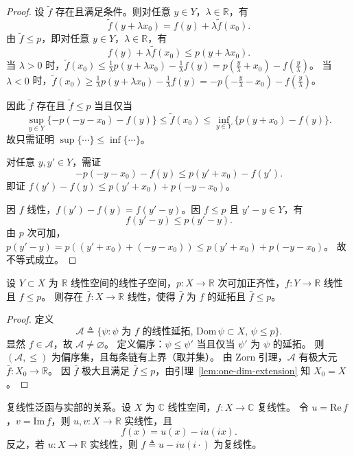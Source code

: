 \documentclass[lang=cn,a4paper,newtx,section]{elegantbook}
\begin{document}
\begin{proof}
  设 $\tilde{f}$ 存在且满足条件。则对任意 $y\in Y$，$\lambda\in\mathbb{R}$，有
  \[
    \tilde{f}(y+\lambda x_0)=f(y)+\lambda\tilde{f}(x_0).
  \]
  由 $\tilde{f}\le p$，即对任意 $y\in Y$，$\lambda\in\mathbb{R}$，有
  \[
    f(y)+\lambda\tilde{f}(x_0)\le p(y+\lambda x_0).
  \]
  当 $\lambda>0$ 时，$\tilde{f}(x_0)\le\frac{1}{\lambda}p(y+\lambda x_0)-\frac{1}{\lambda}f(y)=p\left(\frac{y}{\lambda}+x_0\right)-f\left(\frac{y}{\lambda}\right)$。
  当 $\lambda<0$ 时，$\tilde{f}(x_0)\ge\frac{1}{\lambda}p(y+\lambda x_0)-\frac{1}{\lambda}f(y)=-p\left(-\frac{y}{\lambda}-x_0\right)-f\left(\frac{y}{\lambda}\right)$。

  因此 $\tilde{f}$ 存在且 $\tilde{f}\le p$ 当且仅当
  \[
    \sup_{y\in Y}\{-p(-y-x_0)-f(y)\}\le\tilde{f}(x_0)\le\inf_{y\in Y}\{p(y+x_0)-f(y)\}.
  \]
  故只需证明 $\sup\{\cdots\}\le\inf\{\cdots\}$。

  对任意 $y,y'\in Y$，需证
  \[
    -p(-y-x_0)-f(y)\le p(y'+x_0)-f(y').
  \]
  即证 $f(y')-f(y)\le p(y'+x_0)+p(-y-x_0)$。

  因 $f$ 线性，$f(y')-f(y)=f(y'-y)$。因 $f\le p$ 且 $y'-y\in Y$，有
  \[
    f(y'-y)\le p(y'-y).
  \]
  由 $p$ 次可加，$p(y'-y)=p((y'+x_0)+(-y-x_0))\le p(y'+x_0)+p(-y-x_0)$。
  故不等式成立。
\end{proof}

\begin{theorem}\label{thm:hahn-banach-real}
  设 $Y\subset X$ 为 $\mathbb{R}$ 线性空间的线性子空间，$p:X\to\mathbb{R}$ 次可加正齐性，$f:Y\to\mathbb{R}$ 线性且 $f\le p$。
  则存在 $\bar{f}:X\to\mathbb{R}$ 线性，使得 $\bar{f}$ 为 $f$ 的延拓且 $\bar{f}\le p$。
\end{theorem}

\begin{proof}
  定义
  \[
    \mathcal{A}\triangleq\{\psi:\psi\text{ 为 }f\text{ 的线性延拓},\,\mathrm{Dom}\,\psi\subset X,\,\psi\le p\}.
  \]
  显然 $f\in\mathcal{A}$，故 $\mathcal{A}\ne\varnothing$。
  定义偏序：$\psi\le\psi'$ 当且仅当 $\psi'$ 为 $\psi$ 的延拓。
  则 $(\mathcal{A},\le)$ 为偏序集，且每条链有上界（取并集）。
  由 Zorn 引理，$\mathcal{A}$ 有极大元 $\bar{f}:X_0\to\mathbb{R}$。
  因 $\bar{f}$ 极大且满足 $\bar{f}\le p$，由引理~\ref{lem:one-dim-extension} 知 $X_0=X$。
\end{proof}

\begin{remark}
  复线性泛函与实部的关系。设 $X$ 为 $\mathbb{C}$ 线性空间，$f:X\to\mathbb{C}$ 复线性。
  令 $u=\mathrm{Re}\,f$，$v=\mathrm{Im}\,f$，则 $u,v:X\to\mathbb{R}$ 实线性，且
  \[
    f(x)=u(x)-iu(ix).
  \]
  反之，若 $u:X\to\mathbb{R}$ 实线性，则 $f\triangleq u-iu(i\cdot)$ 为复线性。
\end{remark}
\end{document}
